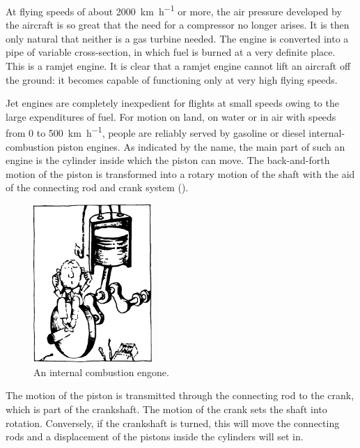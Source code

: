 At flying speeds of about  \SI{2000}{\kilo\meter\per\hour} or more, the air pressure developed by the aircraft is so great that the need for a compressor no longer arises. It is then only nat­ural that neither is a gas turbine needed. The engine is converted into a pipe of variable cross-section, in which fuel is burned at a very definite place. This is a ramjet engine. It is clear that a ramjet engine cannot lift an aircraft off the ground: it becomes capable of function­ing only at very high flying speeds.

Jet engines are completely inexpedient for flights at small speeds owing to the large expenditures of fuel. For motion on land, on water or in air with speeds from 0 to  \SI{500}{\kilo\meter\per\hour}, people are reliably served by gasoline or diesel internal-combustion piston engines. As indicated by the name, the main part of such an engine is the cyl­inder inside which the piston can move. The back-and-forth motion of the piston is transformed into a rotary motion of the shaft with the aid of the connecting rod and crank system ().
\begin{figure}[!ht]
\centering
\includegraphics[width=0.4\textwidth]{figures/fig-07-05.pdf}
\caption{An internal combustion engone.}
\label{fig-7.5}
\end{figure}
The motion of the piston is transmitted through the con­necting rod to the crank, which is part of the crankshaft. The motion of the crank sets the shaft into rotation. Con­versely, if the crankshaft is turned, this will move the connecting rods and a displacement of the pistons inside the cylinders will set in.

